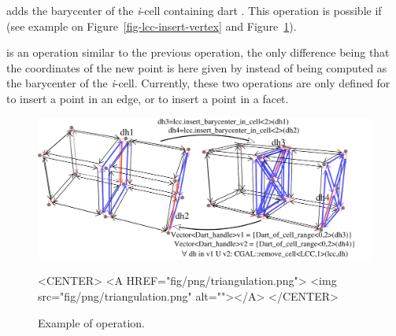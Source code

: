  adds the
barycenter of the \emph{i}-cell containing dart . This
operation is possible if \myin{} (see example
on Figure~\ref{fig-lcc-insert-vertex} and
Figure~\ref{fig-lcc-triangulate}).

 is an operation
similar to the previous operation, the only difference being that the
coordinates of the new point is here given by  instead of being
computed as the barycenter of the \emph{i}-cell.  Currently, these two
operations are only defined for  to insert a point in an
edge, or  to insert a point in a facet.
%
\begin{figure}[htb]
  \begin{ccTexOnly}
    \centerline{\includegraphics[width=.85\textwidth]
      {Linear_cell_complex/fig/pdf/triangulation}}
  \end{ccTexOnly}
  \begin{ccHtmlOnly}
    <CENTER> <A HREF="fig/png/triangulation.png"> <img
    src="fig/png/triangulation.png" alt=""></A> </CENTER>
  \end{ccHtmlOnly}
  \caption{Example of  operation.}
  \label{fig-lcc-triangulate}
\end{figure}
%

